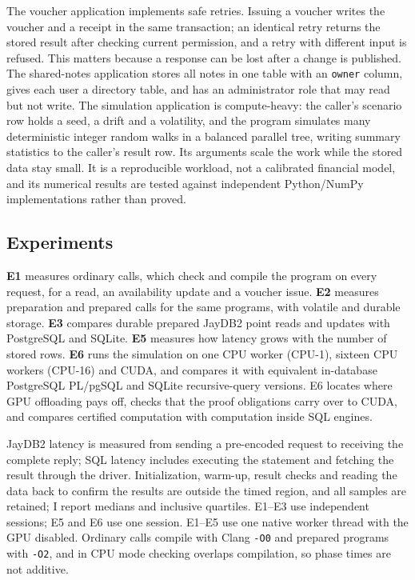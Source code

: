 \documentclass[12pt]{article}
\newcommand{\code}[1]{\texttt{#1}}
\begin{document}
The voucher application implements safe retries. Issuing a voucher writes the
voucher and a receipt in the same transaction; an identical retry returns the
stored result after checking current permission, and a retry with different
input is refused. This matters because a response can be lost after a change is
published. The shared-notes application stores all notes in one table with an
\code{owner} column, gives each user a directory table, and has an administrator
role that may read but not write. The simulation application is compute-heavy:
the caller's scenario row holds a seed, a drift and a volatility, and the
program simulates many deterministic integer random walks in a balanced parallel
tree, writing summary statistics to the caller's result row. Its arguments scale
the work while the stored data stay small. It is a reproducible workload, not a
calibrated financial model, and its numerical results are tested against
independent Python/NumPy implementations rather than proved.

\subsection{Experiments}
\textbf{E1} measures ordinary calls, which check and compile the program on
every request, for a read, an availability update and a voucher issue.
\textbf{E2} measures preparation and prepared calls for the same programs, with
volatile and durable storage. \textbf{E3} compares durable prepared JayDB2 point
reads and updates with PostgreSQL and SQLite. \textbf{E5} measures how latency
grows with the number of stored rows. \textbf{E6} runs the simulation on one CPU
worker (CPU-1), sixteen CPU workers (CPU-16) and CUDA, and compares it with
equivalent in-database PostgreSQL PL/pgSQL and SQLite recursive-query versions.
E6 locates where GPU offloading pays off, checks that the proof obligations
carry over to CUDA, and compares certified computation with computation inside
SQL engines.

JayDB2 latency is measured from sending a pre-encoded request to receiving the
complete reply; SQL latency includes executing the statement and fetching the
result through the driver. Initialization, warm-up, result checks and reading the data back to confirm
the results are outside the timed region, and all samples are retained; I report medians
and inclusive quartiles. E1--E3 use \SessionCount{} independent sessions; E5 and
E6 use one session. E1--E5 use one native worker thread with the GPU disabled.
Ordinary calls compile with Clang \code{-O0} and prepared programs with
\code{-O2}, and in CPU mode checking overlaps compilation, so phase times are
not additive.
\end{document}
